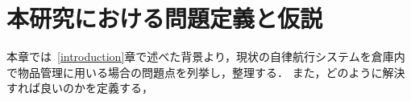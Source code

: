 \chapter{本研究における問題定義と仮説}
\label{issue}
本章では~\ref{introduction}章で述べた背景より，現状の自律航行システムを倉庫内で物品管理に用いる場合の問題点を列挙し，整理する．
また，どのように解決すれば良いのかを定義する，






